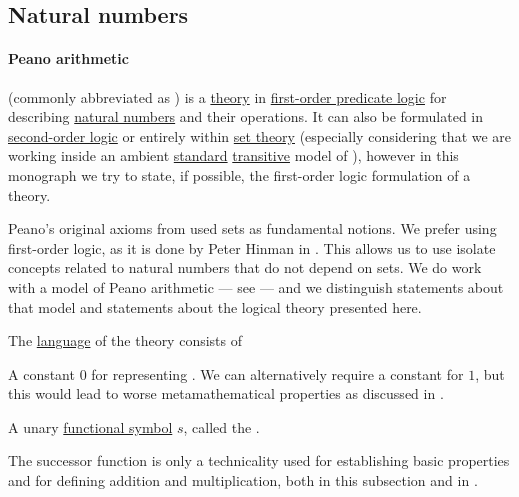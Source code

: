 \subsection{Natural numbers}\label{subsec:natural_numbers}

\paragraph{Peano arithmetic}

\begin{definition}\label{def:peano_arithmetic}
   (commonly abbreviated as ) is a \hyperref[def:first_order_theory]{theory} in \hyperref[subsec:first_order_logic]{first-order predicate logic} for describing \hyperref[def:natural_numbers]{natural numbers} and their operations. It can also be formulated in \hyperref[rem:higher_order_logic]{second-order logic} or entirely within \hyperref[sec:set_theory]{set theory} (especially considering that we are working inside an ambient \hyperref[rem:standard_model_of_set_theory]{standard} \hyperref[rem:transitive_model_of_set_theory]{transitive} model of \hyperref[def:axiom_of_universes]{}), however in this monograph we try to state, if possible, the first-order logic formulation of a theory.

  Peano's original axioms from \cite[1]{Peano1889} used sets as fundamental notions. We prefer using first-order logic, as it is done by Peter Hinman in . This allows us to use isolate concepts related to natural numbers that do not depend on sets. We do work with a model of Peano arithmetic --- see  --- and we distinguish statements about that model and statements about the logical theory presented here.

  The \hyperref[def:first_order_language]{language} of the theory consists of
  \begin{thmenum}[series=def:peano_arithmetic]
     A constant \( 0 \) for representing . We can alternatively require a constant for \( 1 \), but this would lead to worse metamathematical properties as discussed in .

     A unary \hyperref[def:first_order_language/fun]{functional symbol} \( s \), called the .

    The successor function is only a technicality used for establishing basic properties and for defining addition and multiplication, both in this subsection and in .


\end{thmenum}
\end{definition}

